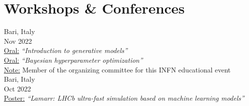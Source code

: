 \newcommand{\contribution}[3][]
  {\normalsize \color{maincolor} \ul{#2:} \emph{``#3''} {#1}}

\newcommand{\nohref}
  {\normalsize \color{hlcolor-2} {-}}
  

\section*{Workshops \& Conferences}
\begin{cvcontent}
  \hypertarget{mlinfn-2022}{\null}\noindent
    {Bari, Italy}\\ [0.5mm]
    {Nov 2022}\\ [0.5mm]
  \contribution{Oral}{Introduction to generative models}
  \hfill
  \href{https://docs.google.com/presentation/d/e/2PACX-1vS2S5IDMRu2MXpZPejKnDinGpjC49L-ayQ6JgW7l86XGRPQ2b6S8vAUxndenxFPJ5yr5RWqes_RlWRL/pub?start=false&loop=false&delayms=60000&slide=id.g17a7e76d956_0_3867}{\faLink}
  \href{https://agenda.infn.it/event/32568/contributions/180759/attachments/99417/138110/intro_gen_models-3rd_mlinfn_hackathon.pdf}{\faFilePdf[regular]}
  \href{https://agenda.infn.it/event/32568/contributions/180759}{\faGlobe}
  \\ [0.5mm]
  \contribution{Oral}{Bayesian hyperparameter optimization}
  \hfill
  \href{https://docs.google.com/presentation/d/e/2PACX-1vQMBlMTBN10DqsvPWoYhwrEt789ZOl7hjbu08LfXMIBvIGh0jBYoyzUxs5R7NYpCviMa4F4xwVWtPDU/pub?start=false&loop=false&delayms=10000&slide=id.g17ab1ea1d03_0_69}{\faLink}
  \href{https://agenda.infn.it/event/32568/contributions/180769/attachments/99647/138397/bayes_hp_opt-3rd_mlinfn_hackathon.pdf}{\faFilePdf[regular]}
  \href{https://agenda.infn.it/event/32568/contributions/180769}{\faGlobe}
  \\ [0.5mm]
  \ul{Note:} Member of the organizing committee for this INFN educational event
  \\ [4mm]
  \hypertarget{acat-2022}{\null}\noindent
    {Bari, Italy}\\ [0.5mm]
    {Oct 2022}\\ [0.5mm]
  \contribution{Poster}{Lamarr: LHCb ultra-fast simulation based on machine learning models}
  \hfill
  \href{https://mbarbetti.github.io/poster-acat2022-lamarr/poster.html}{\faLink}

\end{cvcontent}

